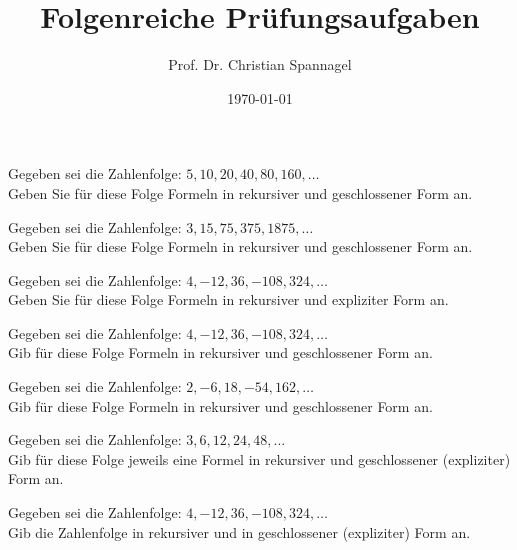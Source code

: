 \documentclass{cssheet}
\title{Folgenreiche Prüfungsaufgaben}
\author{Prof. Dr. Christian Spannagel}
\date{\today}
\begin{document}
\printtitle

\begin{aufgabe}[WiSe 16/17]
	Gegeben sei die Zahlenfolge: $5,10,20,40,80,160, \dots$
	\\
	Geben Sie für diese Folge Formeln in rekursiver und geschlossener Form an.
\end{aufgabe}

\begin{aufgabe}[SoSe 17]
	Gegeben sei die Zahlenfolge: $3, 15, 75, 375, 1875, \dots$
	\\
	Geben Sie für diese Folge Formeln in rekursiver und geschlossener Form an.
\end{aufgabe}

\begin{aufgabe}[SoSe 22]
	Gegeben sei die Zahlenfolge: $4,-12,36,-108,324, \dots$
	\\
	Geben Sie für diese Folge Formeln in rekursiver und expliziter Form an.
\end{aufgabe}

\begin{aufgabe}[SoSe 23]
	Gegeben sei die Zahlenfolge: $4,-12,36,-108,324, \dots$
	\\
	Gib für diese Folge Formeln in rekursiver und geschlossener Form an.
\end{aufgabe}

\begin{aufgabe}[WiSe 23/24]
	Gegeben sei die Zahlenfolge: $2,-6,18,-54,162, \dots$
	\\
	Gib für diese Folge Formeln in rekursiver und geschlossener Form an.
\end{aufgabe}

\begin{aufgabe}[SoSe 24]
	Gegeben sei die Zahlenfolge: $3,6,12,24,48, \dots$
	\\
	Gib für diese Folge jeweils eine Formel in rekursiver und geschlossener (expliziter) Form an.
\end{aufgabe}

\begin{aufgabe}[WiSe 24/25]
	Gegeben sei die Zahlenfolge: $4,-12,36,-108,324, \dots$
	\\
	Gib die Zahlenfolge in rekursiver und in geschlossener (expliziter) Form an.
\end{aufgabe}


\vspace*{10mm}
\printlicense

\printsocials
\end{document}

